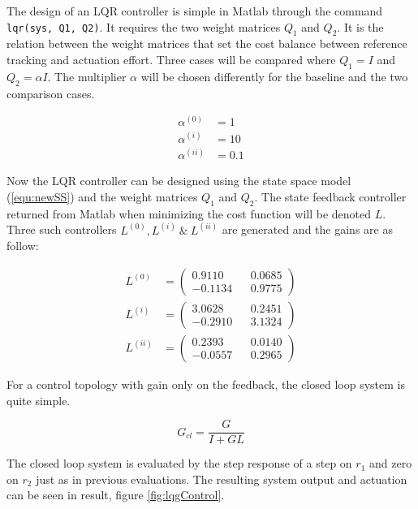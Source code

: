 \documentclass[a4paper, titlepage]{article}
\begin{document}
The design of an LQR controller is simple in Matlab through the command \verb|lqr(sys, Q1, Q2)|.
It requires the two weight matrices $Q_1$ and $Q_2$.
It is the relation between the weight matrices that set the cost balance between  reference tracking and actuation effort.
Three cases will be compared where $Q_1 = I$ and $Q_2 = \alpha I$.
The multiplier $\alpha$ will be chosen differently for the baseline and the two comparison cases.

\begin{equation}
\begin{split}
\alpha^{(0)} &= 1 \\
\alpha^{(i)} &= 10 \\
\alpha^{(ii)} &= 0.1
\end{split}
\end{equation}

Now the LQR controller can be designed using the state space model (\ref{equ:newSS}) and the weight matrices $Q_1$ and $Q_2$.
The state feedback controller returned from Matlab when minimizing the cost function will be denoted $L$.
Three such controllers $L^{(0)}, L^{(i)} \:\&\: L^{(ii)}$ are generated and the gains are as follow:

\begin{equation}
\begin{split}
L^{(0)} &= 
\begin{pmatrix}
0.9110 	&& 0.0685  \\
-0.1134 	&& 0.9775
\end{pmatrix} \\
L^{(i)} &= 
\begin{pmatrix}
3.0628 && 0.2451 \\
-0.2910 && 3.1324
\end{pmatrix} \\
L^{(ii)} &= 
\begin{pmatrix}
0.2393 && 0.0140 \\
-0.0557 && 0.2965
\end{pmatrix}
\end{split}
\label{equ:lqrCont}
\end{equation}

For a control topology with gain only on the feedback, the closed loop system is quite simple.

\begin{equation}
G_{cl} = \frac{G}{I + GL}
\end{equation}

The closed loop system is evaluated by the step response of a step on $r_1$ and zero on $r_2$ just as in previous evaluations.
The resulting system output and actuation can be seen in result, figure \ref{fig:lqgControl}.
\end{document}
